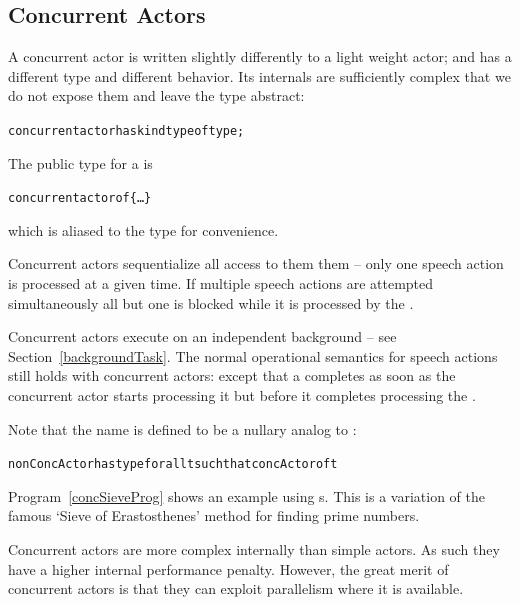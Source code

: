 \subsection{Concurrent Actors}
\label{concActor}
A concurrent actor is written slightly differently to a light weight actor; and has a different type and different behavior. Its internals are sufficiently complex that we do not expose them and leave the  type abstract:
\begin{alltt}
concurrent actor has kind type of type;
\end{alltt}
The public type for a  is 
\begin{alltt}
concurrent actor of \{ \ldots \}
\end{alltt}
which is aliased to the  type for convenience.

Concurrent actors sequentialize all access to them them -- only one speech action is processed at a given time. If multiple speech actions are attempted simultaneously all but one is blocked while it is processed by the .

Concurrent actors execute on an independent background  -- see Section~\vref{backgroundTask}. The normal operational semantics for speech actions still holds with concurrent actors: except that a  completes as soon as the concurrent actor starts processing it but before it completes processing the .


Note that the name  is defined to be a nullary analog to :
\begin{alltt}
nonConcActor has type for all t such that concActor of t 
\end{alltt}

Program~\vref{concSieveProg} shows an example using s. This is a variation of the famous `Sieve of Erastosthenes' method for finding prime numbers. 



\begin{aside}
Concurrent actors are more complex internally than simple actors. As such they have a higher internal performance penalty. However, the great merit of concurrent actors is that they can exploit parallelism where it is available.
\end{aside}
